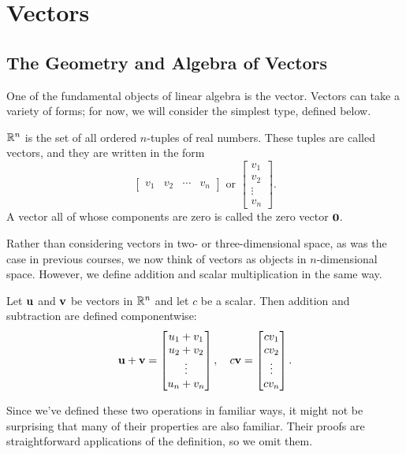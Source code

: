 \documentclass[../m073main.tex]{subfiles}
\begin{document}
\chapter{Vectors}
\section{The Geometry and Algebra of Vectors}
One of the fundamental objects of linear algebra is the vector.
Vectors can take a variety of forms; for now, we will consider the simplest type, defined below.

\begin{definition}[Vectors in $\R^n$]
	$\R^n$ is the set of all ordered $n$-tuples of real numbers.
	These tuples are called vectors, and they are written in the form
	\[ \begin{bmatrix} v_1 & v_2 & \cdots & v_n \end{bmatrix} \text{ or } \begin{bmatrix} v_1 \\ v_2 \\ \vdots \\ v_n \end{bmatrix}. \]
	A vector all of whose components are zero is called the zero vector $\mathbf{0}$.
\end{definition}

Rather than considering vectors in two- or three-dimensional space, as was the case in previous courses, we now think of vectors as objects in $n$-dimensional space.
However, we define addition and scalar multiplication in the same way.

\begin{definition}
	Let $\mathbf{u}$ and $\mathbf{v}$ be vectors in $\R^n$ and let $c$ be a scalar.
	Then addition and subtraction are defined componentwise:
	\[ \mathbf{u} + \mathbf{v} = \begin{bmatrix} u_1 + v_1 \\ u_2 + v_2 \\ \vdots \\ u_n + v_n \end{bmatrix}, \quad c \mathbf{v} = \begin{bmatrix} cv_1 \\ cv_2 \\ \vdots \\ cv_n \end{bmatrix}. \]
\end{definition}

Since we've defined these two operations in familiar ways, it might not be surprising that many of their properties are also familiar.
Their proofs are straightforward applications of the definition, so we omit them.
\end{document}
